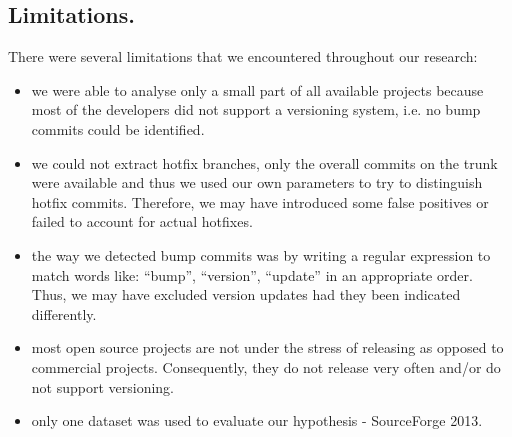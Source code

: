 \subsection{Limitations.}
There were several limitations that we encountered throughout our research:
\begin{itemize}
  \item we were able to analyse only a small part of all available projects because most of the developers did not support a versioning system, i.e. no bump commits could be identified.
  \item we could not extract hotfix branches, only the overall commits on the trunk were available and thus we used our own parameters to try to distinguish hotfix commits. Therefore, we may have introduced some false positives or failed to account for actual hotfixes.
  \item the way we detected bump commits was by writing a regular expression to match words like:  “bump”, “version”, “update” in an appropriate order. Thus, we may have excluded version updates had they been indicated differently. 
  \item most open source projects are not under the stress of releasing as opposed to commercial projects. Consequently, they do not release very often and/or do not support versioning.
  \item only one dataset was used to evaluate our hypothesis - SourceForge 2013.
\end{itemize}

